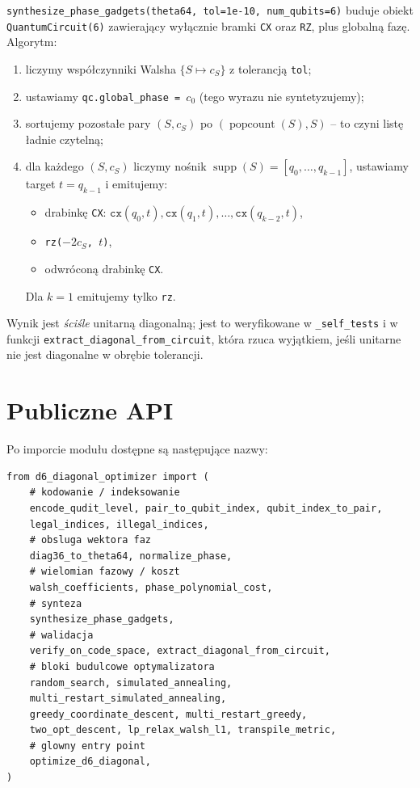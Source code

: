 \documentclass[11pt,a4paper]{article}
\newcommand{\1}{\mathbf{1}}
\newcommand{\popcount}{\operatorname{popcount}}
\newcommand{\supp}{\operatorname{supp}}
\newcommand{\code}[1]{\texttt{#1}}
\begin{document}
\code{synthesize\_phase\_gadgets(theta64, tol=1e-10, num\_qubits=6)}
buduje obiekt \code{QuantumCircuit(6)} zawierający wyłącznie bramki
\code{CX} oraz \code{RZ}, plus globalną fazę. Algorytm:
\begin{enumerate}[leftmargin=*]
  \item liczymy współczynniki Walsha $\{S\mapsto c_{S}\}$
        z tolerancją \code{tol};
  \item ustawiamy \code{qc.global\_phase = $c_{0}$} (tego wyrazu nie
        syntetyzujemy);
  \item sortujemy pozostałe pary $(S,c_{S})$ po
        $(\popcount(S),S)$ -- to czyni listę ładnie czytelną;
  \item dla każdego $(S,c_{S})$ liczymy nośnik $\supp(S)=
        [q_{0},\dots,q_{k-1}]$, ustawiamy target $t=q_{k-1}$ i
        emitujemy:
        \begin{itemize}
          \item drabinkę \code{CX}: $\code{cx}(q_{0},t),
                \code{cx}(q_{1},t),\dots,\code{cx}(q_{k-2},t)$,
          \item \code{rz($-2 c_{S}$, $t$)},
          \item odwróconą drabinkę \code{CX}.
        \end{itemize}
        Dla $k=1$ emitujemy tylko \code{rz}.
\end{enumerate}
Wynik jest \emph{ściśle} unitarną diagonalną; jest to weryfikowane w
\code{\_self\_tests} i w funkcji \code{extract\_diagonal\_from\_circuit},
która rzuca wyjątkiem, jeśli unitarne nie jest diagonalne w obrębie
tolerancji.

\section{Publiczne API}
\label{sec:api}

Po imporcie modułu dostępne są następujące nazwy:

\begin{lstlisting}
from d6_diagonal_optimizer import (
    # kodowanie / indeksowanie
    encode_qudit_level, pair_to_qubit_index, qubit_index_to_pair,
    legal_indices, illegal_indices,
    # obsluga wektora faz
    diag36_to_theta64, normalize_phase,
    # wielomian fazowy / koszt
    walsh_coefficients, phase_polynomial_cost,
    # synteza
    synthesize_phase_gadgets,
    # walidacja
    verify_on_code_space, extract_diagonal_from_circuit,
    # bloki budulcowe optymalizatora
    random_search, simulated_annealing,
    multi_restart_simulated_annealing,
    greedy_coordinate_descent, multi_restart_greedy,
    two_opt_descent, lp_relax_walsh_l1, transpile_metric,
    # glowny entry point
    optimize_d6_diagonal,
)
\end{lstlisting}
\end{document}
